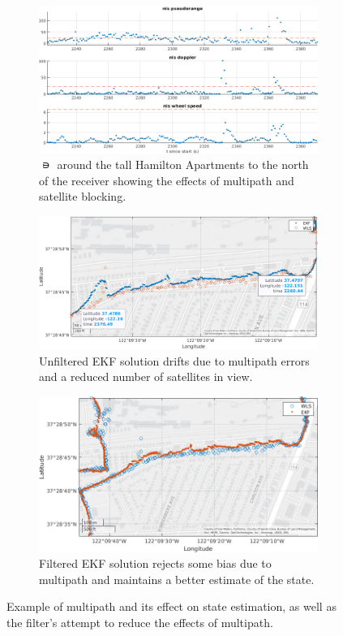 \documentclass[letterpaper,times]{IONconf}
\begin{document}
\begin{figure}
    \centering
    \begin{subfigure}{.45\textwidth}
        \centering
        \includegraphics[width=\textwidth]{multi_nis}
        \caption{$\nis$ around the tall Hamilton Apartments to the north of the receiver showing the effects of multipath and satellite blocking.}
    \end{subfigure}
    \begin{subfigure}{.5\textwidth}
        \centering
        \includegraphics[width=\textwidth]{multi_traj}
        \caption{Unfiltered EKF solution drifts due to multipath errors and a reduced number of satellites in view.}
    \end{subfigure}
    \begin{subfigure}{.5\textwidth}
        \centering
        \includegraphics[width=\textwidth]{multi_filter}
        \caption{Filtered EKF solution rejects some bias due to multipath and maintains a better estimate of the state.}
    \end{subfigure}
    \caption{Example of multipath and its effect on state estimation, as well as the filter's attempt to reduce the effects of multipath.} \label{fig:multi}
\end{figure}
\end{document}
